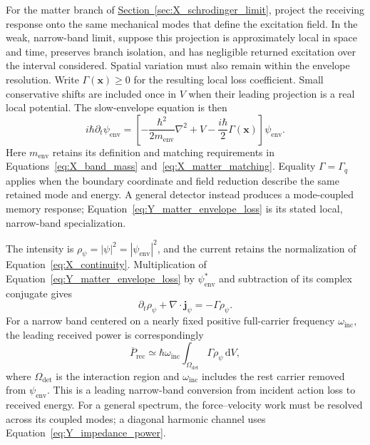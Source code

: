 For the matter branch of \hyperref[sec:X_schrodinger_limit]{Section~\ref*{sec:X_schrodinger_limit}}, project the receiving response onto the same mechanical modes that define the excitation field. In the weak, narrow-band limit, suppose this projection is approximately local in space and time, preserves branch isolation, and has negligible returned excitation over the interval considered. Spatial variation must also remain within the envelope resolution. Write $\Gamma(\mathbf x)\geq0$ for the resulting local loss coefficient. Small conservative shifts are included once in $V$ when their leading projection is a real local potential. The slow-envelope equation is then
\begin{equation}
    \boxed{
    i\hbar\partial_t\psi_{\mathrm{env}}
    =\left[
        -\frac{\hbar^2}{2m_{\mathrm{env}}}\nabla^2+V
        -\frac{i\hbar}{2}\Gamma(\mathbf x)
    \right]\psi_{\mathrm{env}}
    }.
    \label{eq:Y_matter_envelope_loss}
\end{equation}
Here $m_{\mathrm{env}}$ retains its definition and matching requirements in Equations~\eqref{eq:X_band_mass} and~\eqref{eq:X_matter_matching}. Equality $\Gamma=\Gamma_q$ applies when the boundary coordinate and field reduction describe the same retained mode and energy. A general detector instead produces a mode-coupled memory response; Equation~\eqref{eq:Y_matter_envelope_loss} is its stated local, narrow-band specialization.

The intensity is $\rho_\psi=|\psi|^2=|\psi_{\mathrm{env}}|^2$, and the current retains the normalization of Equation~\eqref{eq:X_continuity}. Multiplication of Equation~\eqref{eq:Y_matter_envelope_loss} by $\psi_{\mathrm{env}}^*$ and subtraction of its complex conjugate gives
\begin{equation}
    \boxed{
    \partial_t\rho_\psi+\nabla\cdot\mathbf j_\psi
    =-\Gamma\rho_\psi
    }.
    \label{eq:Y_matter_action_balance}
\end{equation}
For a narrow band centered on a nearly fixed positive full-carrier frequency $\omega_{\mathrm{inc}}$, the leading received power is correspondingly
\begin{equation}
    \overline P_{\mathrm{rec}}
    \simeq\hbar\omega_{\mathrm{inc}}
    \int_{\Omega_{\mathrm{det}}}\Gamma\rho_\psi\,\mathrm dV,
    \label{eq:Y_band_received_power}
\end{equation}
where $\Omega_{\mathrm{det}}$ is the interaction region and $\omega_{\mathrm{inc}}$ includes the rest carrier removed from $\psi_{\mathrm{env}}$. This is a leading narrow-band conversion from incident action loss to received energy. For a general spectrum, the force--velocity work must be resolved across its coupled modes; a diagonal harmonic channel uses Equation~\eqref{eq:Y_impedance_power}.

